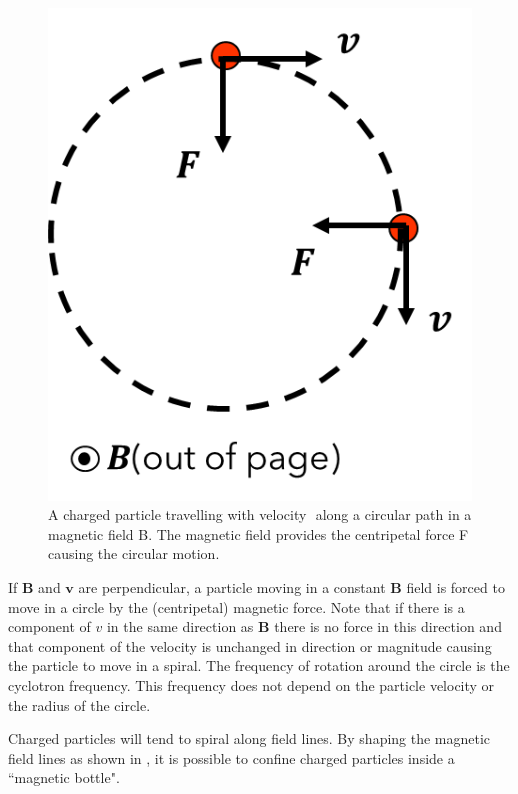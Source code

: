 \documentclass[
]{book}
\numberwithin{equation}{section}
\begin{document}
\begin{figure}

{\centering \includegraphics[width=0.7\linewidth]{Figures/circular_path} 

}

\caption{A charged particle travelling with velocity $$ along a circular path in a magnetic field B. The magnetic field provides the centripetal force F causing the circular motion.}\label{fig:circularPath}
\end{figure}

If \(\mathbf{B}\) and \(\mathbf{v}\) are perpendicular, a particle moving in a constant \(\mathbf{B}\)
field is forced to move in a circle by the (centripetal) magnetic force.
Note that if there is a component of \(v\) in the same direction as \(\mathbf{B}\)
there is no force in this direction and that component of the velocity
is unchanged in direction or magnitude causing the particle to move in a
spiral. The frequency of rotation around the circle is the cyclotron
frequency. This frequency does not depend on the particle velocity or
the radius of the circle.

Charged particles will tend to spiral along field lines. By shaping the
magnetic field lines as shown in , it is possible to confine charged
particles inside a ``magnetic bottle".
\end{document}
